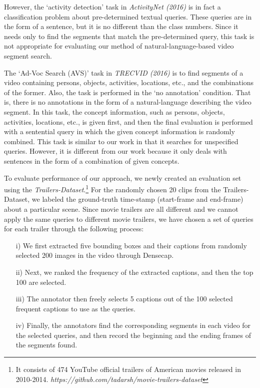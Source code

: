 However, the `activity detection' task in {\itshape ActivityNet (2016)} is in fact a classification problem about pre-determined textual queries. These queries are in the form of a sentence, but it is no different than the class numbers. Since it needs only to find the segments that match the pre-determined query, this task is not appropriate for evaluating our method of natural-language-based video segment search.

The `Ad-Voc Search (AVS)' task in {\itshape TRECVID (2016)} is to find segments of a video containing persons, objects, activities, locations, etc., and the combinations of the former. Also, the task is performed in the `no annotation' condition. That is, there is no annotations in the form of a natural-language describing the video segment.
In this task, the concept information, such as persons, objects, activities, locations, etc., is given first, and then the final evaluation is performed with a sentential query in which the given concept information is randomly combined. 
This task is similar to our work in that it searches for unspecified queries.
However, it is different from our work because it only deals with sentences in the form of a combination of given concepts.

To evaluate performance of our approach, we newly created an evaluation set using the {\itshape Trailers-Dataset}.\footnote{It consists of 474 YouTube official trailers of American movies released in 2010-2014. \textit{https://github.com/tadarsh/movie-trailers-dataset}} 
For the randomly chosen 20 clips from the Trailers-Dataset, we labeled the ground-truth time-stamp (start-frame and end-frame) about a particular scene. 
Since movie trailers are all different and we cannot apply the same queries to different movie trailers, we have chosen a set of queries for each trailer through the following process: 

\begin{enumerate}[wide, labelwidth=!, labelindent=0pt]

\item[i)] We first extracted five bounding boxes and their captions from randomly selected 200 images in the video through Densecap. 

\item[ii)] Next, we ranked the frequency of the extracted captions, and then the top 100 are selected.

\item[iii)] The annotator then freely selects 5 captions out of the 100 selected frequent captions to use as the queries.

\item[iv)] Finally, the annotators find the corresponding segments in each video for the selected queries, and then record the beginning and the ending frames of the segments found. 

\end{enumerate}


